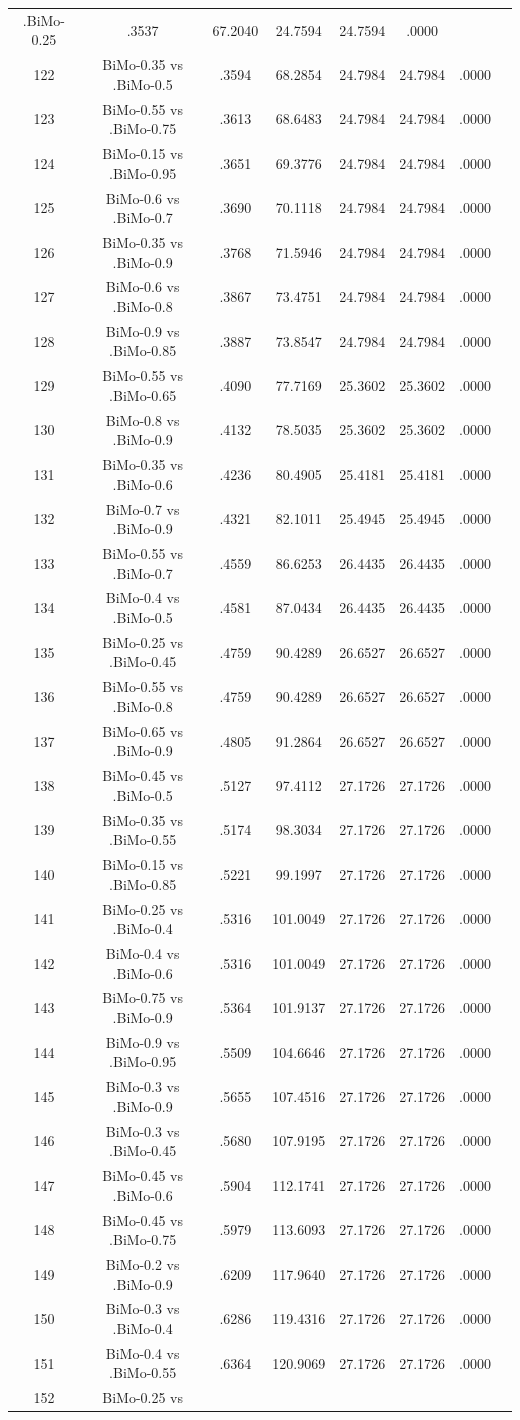 \documentclass[a4paper,10pt]{article}
\begin{document}
\begin{landscape}
\begin{table}[!htp]
\begin{tabular}{cccccccc}
.BiMo-0.25&.3537&67.2040&24.7594&24.7594&.0000\\122&BiMo-0.35 vs .BiMo-0.5&.3594&68.2854&24.7984&24.7984&.0000\\123&BiMo-0.55 vs .BiMo-0.75&.3613&68.6483&24.7984&24.7984&.0000\\124&BiMo-0.15 vs .BiMo-0.95&.3651&69.3776&24.7984&24.7984&.0000\\125&BiMo-0.6 vs .BiMo-0.7&.3690&70.1118&24.7984&24.7984&.0000\\126&BiMo-0.35 vs .BiMo-0.9&.3768&71.5946&24.7984&24.7984&.0000\\127&BiMo-0.6 vs .BiMo-0.8&.3867&73.4751&24.7984&24.7984&.0000\\128&BiMo-0.9 vs .BiMo-0.85&.3887&73.8547&24.7984&24.7984&.0000\\129&BiMo-0.55 vs .BiMo-0.65&.4090&77.7169&25.3602&25.3602&.0000\\130&BiMo-0.8 vs .BiMo-0.9&.4132&78.5035&25.3602&25.3602&.0000\\131&BiMo-0.35 vs .BiMo-0.6&.4236&80.4905&25.4181&25.4181&.0000\\132&BiMo-0.7 vs .BiMo-0.9&.4321&82.1011&25.4945&25.4945&.0000\\133&BiMo-0.55 vs .BiMo-0.7&.4559&86.6253&26.4435&26.4435&.0000\\134&BiMo-0.4 vs .BiMo-0.5&.4581&87.0434&26.4435&26.4435&.0000\\135&BiMo-0.25 vs .BiMo-0.45&.4759&90.4289&26.6527&26.6527&.0000\\136&BiMo-0.55 vs .BiMo-0.8&.4759&90.4289&26.6527&26.6527&.0000\\137&BiMo-0.65 vs .BiMo-0.9&.4805&91.2864&26.6527&26.6527&.0000\\138&BiMo-0.45 vs .BiMo-0.5&.5127&97.4112&27.1726&27.1726&.0000\\139&BiMo-0.35 vs .BiMo-0.55&.5174&98.3034&27.1726&27.1726&.0000\\140&BiMo-0.15 vs .BiMo-0.85&.5221&99.1997&27.1726&27.1726&.0000\\141&BiMo-0.25 vs .BiMo-0.4&.5316&101.0049&27.1726&27.1726&.0000\\142&BiMo-0.4 vs .BiMo-0.6&.5316&101.0049&27.1726&27.1726&.0000\\143&BiMo-0.75 vs .BiMo-0.9&.5364&101.9137&27.1726&27.1726&.0000\\144&BiMo-0.9 vs .BiMo-0.95&.5509&104.6646&27.1726&27.1726&.0000\\145&BiMo-0.3 vs .BiMo-0.9&.5655&107.4516&27.1726&27.1726&.0000\\146&BiMo-0.3 vs .BiMo-0.45&.5680&107.9195&27.1726&27.1726&.0000\\147&BiMo-0.45 vs .BiMo-0.6&.5904&112.1741&27.1726&27.1726&.0000\\148&BiMo-0.45 vs .BiMo-0.75&.5979&113.6093&27.1726&27.1726&.0000\\149&BiMo-0.2 vs .BiMo-0.9&.6209&117.9640&27.1726&27.1726&.0000\\150&BiMo-0.3 vs .BiMo-0.4&.6286&119.4316&27.1726&27.1726&.0000\\151&BiMo-0.4 vs .BiMo-0.55&.6364&120.9069&27.1726&27.1726&.0000\\152&BiMo-0.25 vs 
\end{tabular}
\end{table}
\end{landscape}
\end{document}

